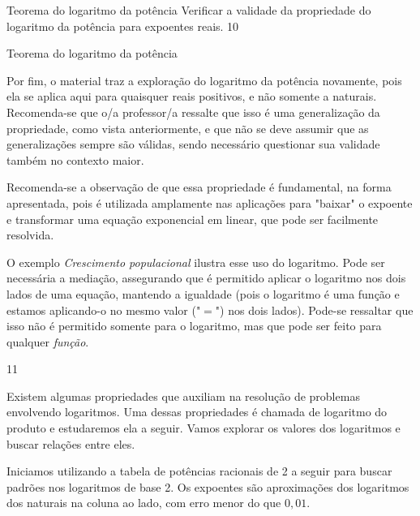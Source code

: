 \begin{objectives}{Teorema do logaritmo da potência}
{
	Verificar a validade da propriedade do logaritmo da potência para expoentes reais.
}{1}{0}
\end{objectives}
\clearpage
\begin{sugestions}{Teorema do logaritmo da potência}
{
	Por fim, o material traz a exploração do logaritmo da potência novamente, pois  ela se aplica aqui para quaisquer reais positivos, e não somente a naturais. Recomenda-se que o/a professor/a ressalte que isso é uma generalização da propriedade, como vista anteriormente, e que não se deve assumir que as generalizações sempre são válidas, sendo necessário questionar sua validade também no contexto maior.

	Recomenda-se a observação de que essa propriedade é fundamental, na forma apresentada, pois é utilizada amplamente nas aplicações para "baixar" o expoente e transformar uma equação exponencial em linear, que pode ser facilmente resolvida.

	O exemplo \textit{Crescimento populacional} ilustra esse uso do logaritmo. Pode ser necessária a mediação, assegurando que é permitido aplicar o logaritmo nos dois lados de uma equação, mantendo a igualdade (pois o logaritmo é uma função e estamos aplicando-o no mesmo valor ("$=$") nos dois lados). Pode-se ressaltar que isso não é permitido somente para o logaritmo, mas que pode ser feito para qualquer \textit{função}.
}{1}{1}
\end{sugestions}
\label{prod_logaritmo}

Existem algumas propriedades que auxiliam na resolução de problemas envolvendo logaritmos. Uma dessas propriedades é chamada de logaritmo do produto e estudaremos ela a seguir.  Vamos explorar os valores dos logaritmos e buscar relações entre eles.%


Iniciamos utilizando a tabela de potências racionais de 2 a seguir para buscar padrões nos logaritmos de base 2. Os expoentes são aproximações dos logaritmos dos naturais na coluna ao lado, com erro menor do que $0,01$.

